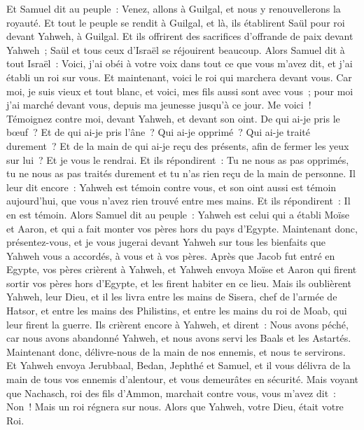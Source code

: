\begin{multicols}{2}
Et Samuel dit au peuple~: Venez, allons à Guilgal, et nous y renouvellerons la royauté.
Et tout le peuple se rendit à Guilgal, et là, ils établirent Saül pour roi devant Yahweh, à Guilgal. Et ils offrirent des sacrifices d'offrande de paix devant Yahweh~; Saül et tous ceux d'Israël se réjouirent beaucoup.
\VerseOne{}Alors Samuel dit à tout Israël~: Voici, j'ai obéi à votre voix dans tout ce que vous m'avez dit, et j'ai établi un roi sur vous.
Et maintenant, voici le roi qui marchera devant vous. Car moi, je suis vieux et tout blanc, et voici, mes fils aussi sont avec vous~; pour moi j'ai marché devant vous, depuis ma jeunesse jusqu'à ce jour.
Me voici~! Témoignez contre moi, devant Yahweh, et devant son oint. De qui ai-je pris le bœuf~? Et de qui ai-je pris l'âne~? Qui ai-je opprimé~? Qui ai-je traité durement~? Et de la main de qui ai-je reçu des présents, afin de fermer les yeux sur lui~? Et je vous le rendrai.
Et ils répondirent~: Tu ne nous as pas opprimés, tu ne nous as pas traités durement et tu n'as rien reçu de la main de personne.
Il leur dit encore~: Yahweh est témoin contre vous, et son oint aussi est témoin aujourd'hui, que vous n'avez rien trouvé entre mes mains. Et ils répondirent~: Il en est témoin.
Alors Samuel dit au peuple~: Yahweh est celui qui a établi Moïse et Aaron, et qui a fait monter vos pères hors du pays d'Egypte.
Maintenant donc, présentez-vous, et je vous jugerai devant Yahweh sur tous les bienfaits que Yahweh vous a accordés, à vous et à vos pères.
Après que Jacob fut entré en Egypte, vos pères crièrent à Yahweh, et Yahweh envoya Moïse et Aaron qui firent sortir vos pères hors d'Egypte, et les firent habiter en ce lieu.
Mais ils oublièrent Yahweh, leur Dieu, et il les livra entre les mains de Sisera, chef de l'armée de Hatsor, et entre les mains des Philistins, et entre les mains du roi de Moab, qui leur firent la guerre.
Ils crièrent encore à Yahweh, et dirent~: Nous avons péché, car nous avons abandonné Yahweh, et nous avons servi les Baals et les Astartés. Maintenant donc, délivre-nous de la main de nos ennemis, et nous te servirons.
Et Yahweh envoya Jerubbaal, Bedan, Jephthé et Samuel, et il vous délivra de la main de tous vos ennemis d'alentour, et vous demeurâtes en sécurité.
Mais voyant que Nachasch, roi des fils d'Ammon, marchait contre vous, vous m'avez dit~: Non~! Mais un roi régnera sur nous. Alors que Yahweh, votre Dieu, était votre Roi.

\end{multicols}
